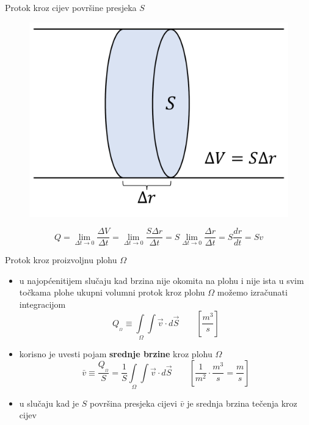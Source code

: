 \documentclass[croatian]{beamer}
\begin{document}
\begin{frame}{Protok kroz cijev površine presjeka $S$}

\begin{figure}
\includegraphics[scale=0.25]{slike/protok-kroz-cijev}
\end{figure}
\[
Q=\lim_{\Delta t\rightarrow0}\frac{\Delta V}{\Delta t}=\lim_{\Delta t\rightarrow0}\frac{S\Delta r}{\Delta t}=S\lim_{\Delta t\rightarrow0}\frac{\Delta r}{\Delta t}=S\frac{dr}{dt}=Sv
\]
\end{frame}

\begin{frame}{Protok kroz proizvoljnu plohu $\varOmega$}

\begin{itemize}
\item u najopćenitijem slučaju kad brzina nije okomita na plohu i nije ista
u svim točkama plohe ukupni volumni protok kroz plohu $\varOmega$
možemo izračunati integracijom
\[
Q_{_{\varOmega}}\equiv\int\limits _{\;\varOmega}\!\!\!\!\!\int\vec{v}\cdot d\vec{S}\quad\quad[\frac{m^{3}}{s}]
\]
\item korisno je uvesti pojam \textbf{srednje brzine} kroz plohu $\varOmega$
\[
\bar{v}\equiv\frac{Q_{_{\varOmega}}}{S}=\frac{1}{S}\int\limits _{\;\varOmega}\!\!\!\!\!\int\vec{v}\cdot d\vec{S}\quad\quad[\frac{1}{m^{2}}\cdot\frac{m^{3}}{s}=\frac{m}{s}]
\]
\item u slučaju kad je $S$ površina presjeka cijevi $\bar{v}$ je srednja
brzina tečenja kroz cijev
\end{itemize}
\end{frame}
\end{document}
